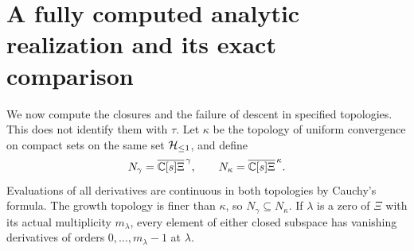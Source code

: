 \section{A fully computed analytic realization and its exact comparison}
\label{sec:cq-analytic}
We now compute the closures and the failure of descent in specified
topologies. This does not identify them with $\tau$.
Let $\kappa$ be the topology of uniform convergence on compact sets
on the same set $\mathcal H_{\leq 1}$, and define
\[
 N_\gamma=\overline{\mathbb C[s]\Xi}^{\,\gamma},\qquad
 N_\kappa=\overline{\mathbb C[s]\Xi}^{\,\kappa}.
\]
Evaluations of all derivatives are continuous in both topologies by
Cauchy's formula. The growth topology is finer than $\kappa$, so
$N_\gamma\subseteq N_\kappa$.
If $\lambda$ is a zero of $\Xi$ with its actual multiplicity $m_\lambda$,
every element of either closed subspace has vanishing derivatives
of orders $0,\ldots,m_\lambda-1$ at $\lambda$.

